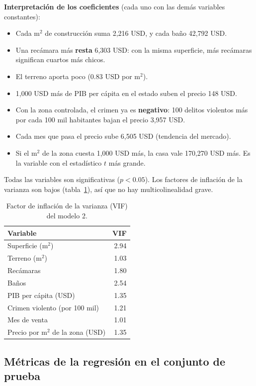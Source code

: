 \documentclass[12pt,letterpaper]{article}
\begin{document}
\textbf{Interpretación de los coeficientes} (cada uno con las demás variables constantes):
\begin{itemize}[nosep]
  \item Cada m$^2$ de construcción suma 2,216 USD, y cada baño 42,792 USD.
  \item Una recámara más \textbf{resta} 6,303 USD: con la misma superficie, más recámaras significan cuartos más chicos.
  \item El terreno aporta poco (0.83 USD por m$^2$).
  \item 1,000 USD más de PIB per cápita en el estado suben el precio 148 USD.
  \item Con la zona controlada, el crimen ya es \textbf{negativo}: 100 delitos violentos más por cada 100 mil habitantes bajan el precio 3,957 USD.
  \item Cada mes que pasa el precio sube 6,505 USD (tendencia del mercado).
  \item Si el m$^2$ de la zona cuesta 1,000 USD más, la casa vale 170,270 USD más. Es la variable con el estadístico $t$ más grande.
\end{itemize}

Todas las variables son significativas ($p < 0.05$). Los factores de inflación de la varianza son bajos (tabla~\ref{tab:vif}), así que no hay multicolinealidad grave.

\begin{table}[H]
\centering
\caption{Factor de inflación de la varianza (VIF) del modelo 2.}\label{tab:vif}
\small
\begin{tabular}{lr}
\toprule
Variable & VIF \\
\midrule
Superficie (m$^2$) & 2.94 \\
Terreno (m$^2$) & 1.03 \\
Recámaras & 1.80 \\
Baños & 2.54 \\
PIB per cápita (USD) & 1.35 \\
Crimen violento (por 100 mil) & 1.21 \\
Mes de venta  & 1.01 \\
Precio por m$^2$ de la zona (USD) & 1.35 \\
\bottomrule
\end{tabular}
\end{table}

\subsection{Métricas de la regresión en el conjunto de prueba}
\end{document}
